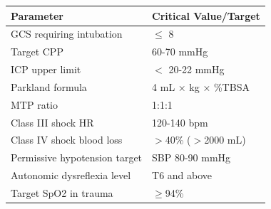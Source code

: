 \documentclass[11pt]{article}
\begin{document}
\vspace{0.5cm}

\begin{tcolorbox}[colback=red!5!white,colframe=red!75!black,title=\textbf{CRITICAL NUMBERS TO MEMORIZE}]

\begin{center}
\begin{tabular}{|l|l|}
\hline
\textbf{Parameter} & \textbf{Critical Value/Target} \\
\hline
GCS requiring intubation & $\leq$ 8 \\
\hline
Target CPP & 60-70 mmHg \\
\hline
ICP upper limit & $<$ 20-22 mmHg \\
\hline
Parkland formula & 4 mL × kg × \%TBSA \\
\hline
MTP ratio & 1:1:1 \\
\hline
Class III shock HR & 120-140 bpm \\
\hline
Class IV shock blood loss & $>$40\% ($>$2000 mL) \\
\hline
Permissive hypotension target & SBP 80-90 mmHg \\
\hline
Autonomic dysreflexia level & T6 and above \\
\hline
Target SpO2 in trauma & $\geq$94\% \\
\hline
\end{tabular}
\end{center}

\end{tcolorbox}

\vspace{0.5cm}
\end{document}
